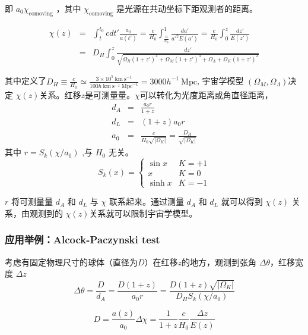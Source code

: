 \documentclass[12pt]{ctexart}
\begin{document}
即 $a_0 \chi_\text{comoving}$ ，其中 $\chi_\text{comoving}$ 是光源在共动坐标下距观测者的距离。 

\begin{eqnarray}
    \chi(z) &=& \int_t^{t_0} cdt' \frac{a_0}{a(t')} = \frac{c}{H_0}\int_{\frac{a}{a_0}}^1 \frac{da'}{a'^2 E(a')} =\frac{c}{H_0}\int_0^z \frac{dz'}{E(z')} \\ 
    &=&  D_H \int_0^z \frac{dz'}{ \sqrt{\Omega_R(1+z')^{4}+\Omega_M(1+z')^{3}+\Omega_\Lambda+\Omega_K(1+z')^{2} }}
\end{eqnarray}

其中定义了$D_H\equiv\frac{c}{H_0}\simeq\frac{3\times10^5 \mathrm{~km} \mathrm{~s}^{-1}}{100 h \mathrm{~km} \mathrm{~s}^{-1} \mathrm{~Mpc}^{-1}} = 3000 h^{-1}  \mathrm{~Mpc}$,
宇宙学模型 $\left(\Omega_M, \Omega_\Lambda\right) $决定 $\chi(z)$关系。红移$z$是可测量量。$\chi$可以转化为光度距离或角直径距离，
\begin{eqnarray}
    d_A &=& \frac{a_0 r}{1+z}
    \\ d_L &=& (1+z) a_0 r
    \\ a_0 &=& \frac{c}{H_0\sqrt{|\Omega_K|} } = \frac{D_H}{\sqrt{|\Omega_K|}} 
\end{eqnarray}
其中 
$r = S_k(\chi/a_0)$ ,与 $H_0$ 无关。 
\begin{equation}
    S_k(x) = 
    \begin{cases}
        \sin x & K=+1 \\ 
        x & K=0 \\ 
        \sinh x & K=-1
    \end{cases}
\end{equation}

$r$ 将可测量量 $d_A$ 和 $d_L$ 与  $\chi$ 联系起来。通过测量 $d_A$ 和 $d_L$ 就可以得到 $\chi(z)$ 关系，由观测到的 $\chi(z)$关系就可以限制宇宙学模型。

\subsubsection{应用举例：Alcock-Paczynski test}

考虑有固定物理尺寸的球体（直径为$D$）在红移$z$的地方，观测到张角 $\Delta \theta$，红移宽度 $\Delta z$  
\begin{equation}
    \Delta \theta = \frac{D }{d_A} = \frac{D(1+z)}{a_0r} = \frac{D(1+z)\sqrt{|\Omega_K|}}{D_H S_k(\chi/a_0)}
\end{equation}

\begin{equation}
    D=\frac{a(z)}{a_{0}} \Delta \chi=\frac{1}{1+z} \frac{c}{H_{0}} \frac{\Delta z}{E(z)}
\end{equation}
\end{document}

